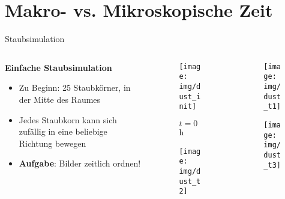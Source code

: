 \section{Makro- vs. Mikroskopische Zeit}

\begin{frame}{Staubsimulation}
    \begin{columns}
        \begin{column}{.6\textwidth}
            \textbf{Einfache Staubsimulation}
            \begin{itemize}
                \item Zu Beginn: 25 Staubkörner, in der Mitte des Raumes
                \item Jedes Staubkorn kann sich zufällig in eine beliebige Richtung bewegen
                \item \textbf{Aufgabe}: Bilder zeitlich ordnen!
            \end{itemize}

        \end{column}
        \begin{column}{.2\textwidth}
            \begin{figure}
                \texttt{[image: img/dust\_init]}
                \caption{$t = 0\,$h}
            \end{figure}
            \begin{figure}
                \texttt{[image: img/dust\_t2]}
                \caption{}
            \end{figure}
        \end{column}
        \begin{column}{.2\textwidth}
            \begin{figure}
                \texttt{[image: img/dust\_t1]}
                \caption{}
            \end{figure}
            \begin{figure}
                \texttt{[image: img/dust\_t3]}
                \caption{}
            \end{figure}
        \end{column}
    \end{columns}
\end{frame}

